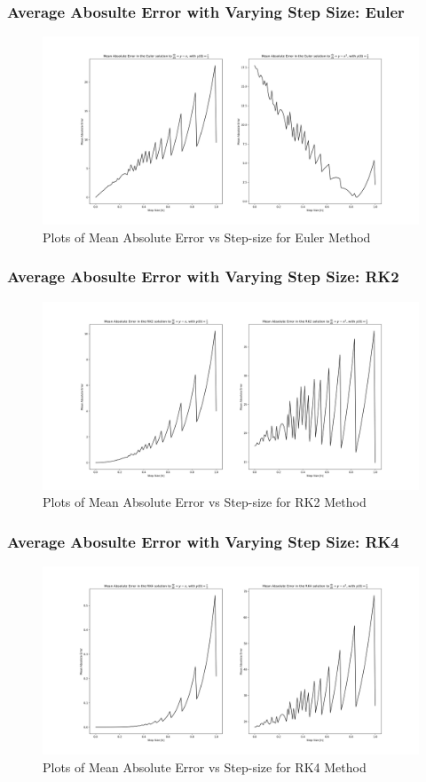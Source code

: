 \documentclass{beamer}
\begin{document}
\begin{frame}
    \frametitle{Average Abosulte Error with Varying Step Size: Euler } 
    \begin{figure}[h]
        \centering
        \includegraphics[width=\linewidth]{"errors_euler.png"}
        \caption{Plots of Mean Absolute Error vs Step-size for Euler Method}
    \end{figure}
\end{frame}
\begin{frame}
    \frametitle{Average Abosulte Error with Varying Step Size: RK2 } 
    \begin{figure}[h]
        \centering
        \includegraphics[width=\linewidth]{"errors_rk2.png"}
        \caption{Plots of Mean Absolute Error vs Step-size for RK2 Method}
    \end{figure}
\end{frame}
\begin{frame}
    \frametitle{Average Abosulte Error with Varying Step Size: RK4 } 
    \begin{figure}[h]
        \centering
        \includegraphics[width=\linewidth]{"errors_rk4.png"}
        \caption{Plots of Mean Absolute Error vs Step-size for RK4 Method}
    \end{figure}
\end{frame}
\end{document}
